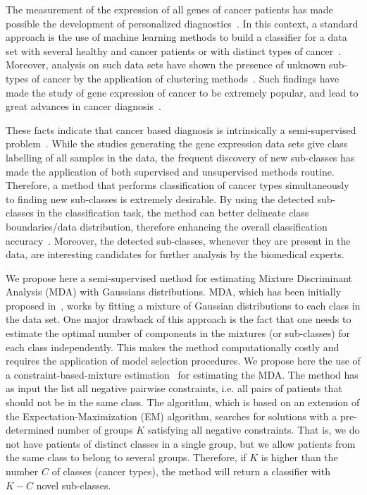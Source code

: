 \documentclass[runningheads,a4paper]{llncs}
\begin{document}
The measurement of the expression of all genes of cancer patients has
made possible the development of personalized
diagnostics~\cite{Veer2008}. In this context, a standard approach is
the use of machine learning methods to build a classifier for a data
set with several healthy and cancer patients or with distinct types of
cancer~\cite{Spang2003}. Moreover, analysis on such data sets have
shown the presence of unknown sub-types of cancer by the application
of clustering methods~\cite{Alizadeh2000,Golub1999}. Such findings
have made the study of gene expression of cancer to be extremely
popular, and lead to great advances in cancer
diagnosis~\cite{Veer2008}.

These facts indicate that cancer based diagnosis is intrinsically a
semi-supervised problem~\cite{Chapelle2006}. While the studies
generating the gene expression data sets give class labelling of all
samples in the data, the frequent discovery of new sub-classes has
made the application of both supervised and unsupervised methods
routine. Therefore, a method that performs classification of cancer
types simultaneously to finding new sub-classes is extremely
desirable. By using the detected sub-classes in the classification
task, the method can better delineate class boundaries/data
distribution, therefore enhancing the overall classification
accuracy~\cite{Hastie1996}.  Moreover, the detected sub-classes,
whenever they are present in the data, are interesting candidates for
further analysis by the biomedical experts.

We propose here a semi-supervised method for estimating Mixture
Discriminant Analysis (MDA) with Gaussians distributions. MDA, which
has been initially proposed in~\cite{Hastie1996}, works by fitting a
mixture of Gaussian distributions to each class in the data set. One
major drawback of this approach is the fact that one needs to estimate
the optimal number of components in the mixtures (or sub-classes) for
each class independently. This makes the method computationally costly
and requires the application of model selection procedures.  We
propose here the use of a constraint-based-mixture
estimation~\cite{Lange2005} for estimating the MDA. The method has as
input the list all negative pairwise constraints, i.e. all pairs of
patients that should not be in the same class. The algorithm, which is
based on an extension of the Expectation-Maximization (EM) algorithm,
searches for solutions with a pre-determined number of groups $K$
satisfying all negative constraints. That is, we do not have patients
of distinct classes in a single group, but we allow patients from the
same class to belong to several groups. Therefore, if $K$ is higher
than the number $C$ of classes (cancer types), the method will return
a classifier with $K-C$ novel sub-classes.
\end{document}
